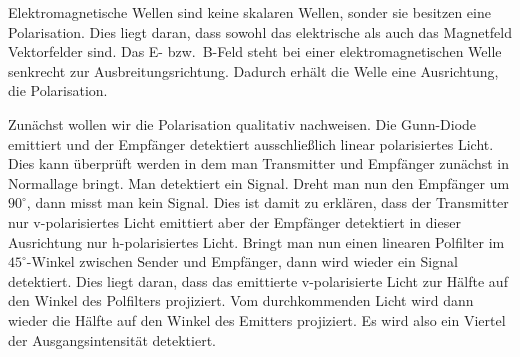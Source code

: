 \documentclass[a4paper,10pt,twocolumn]{article}
\begin{document}
    
    
%
    
    Elektromagnetische Wellen sind keine skalaren Wellen, sonder sie besitzen eine Polarisation.
    Dies liegt daran, dass sowohl das elektrische als auch das Magnetfeld Vektorfelder sind.
    Das E- bzw.\ B-Feld steht bei einer elektromagnetischen Welle senkrecht zur Ausbreitungsrichtung.
    Dadurch erhält die Welle eine Ausrichtung, die Polarisation.
    
    Zunächst wollen wir die Polarisation qualitativ nachweisen.
    Die Gunn-Diode emittiert und der Empfänger detektiert ausschließlich linear polarisiertes Licht.
    Dies kann überprüft werden in dem man Transmitter und Empfänger zunächst in Normallage bringt.
    Man detektiert ein Signal.
    Dreht man nun den Empfänger um $90^\circ$, dann misst man kein Signal.
    Dies ist damit zu erklären, dass der Transmitter nur v-polarisiertes Licht emittiert aber der Empfänger detektiert in
    dieser Ausrichtung nur h-polarisiertes Licht.
    Bringt man nun einen linearen Polfilter im $45^\circ$-Winkel zwischen Sender und Empfänger, dann wird
    wieder ein Signal detektiert.
    Dies liegt daran, dass das emittierte v-polarisierte Licht zur Hälfte auf den Winkel des Polfilters
    projiziert. 
    Vom durchkommenden Licht wird dann wieder die Hälfte auf den Winkel des Emitters projiziert.
    Es wird also ein Viertel der Ausgangsintensität detektiert.
    
\end{document}
